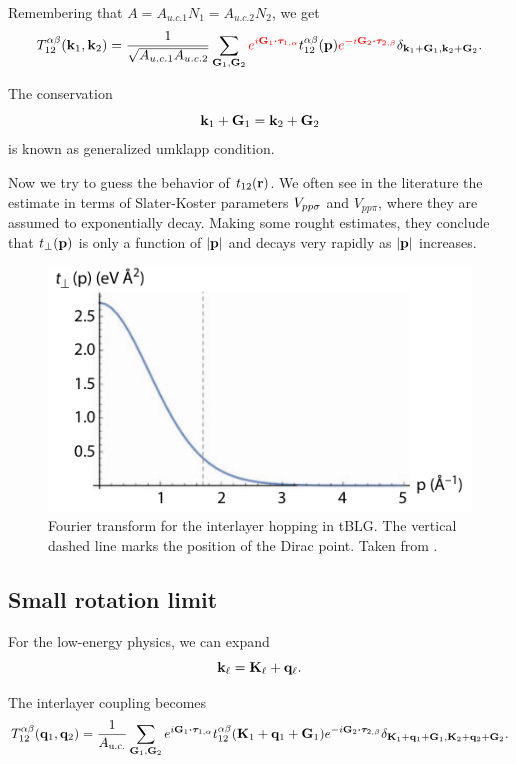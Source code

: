 \documentclass[a4paper,10pt]{article}
\begin{document}
Remembering that $A = A_{u.c.1} N_1 = A_{u.c.2} N_2$, we get
$$
T_{12}^{\alpha\beta}(\k_1,\k_2) = \frac{1}{\sqrt{A_{u.c.1} A_{u.c.2}}}
\sum_{\G_1, \G_2} \textcolor{red}{e^{i\G_1\vdot\vtau_{1,\alpha}}} t_{12}^{\alpha\beta}(\p)
\textcolor{red}{e^{-i\G_2\vdot\vtau_{2,\beta}}} \delta_{\k_1+\G_1, \k_2+\G_2}.
$$

The conservation
$$
{\vb{k}}_1 + {\vb{G}}_1 = {\vb{k}}_2 + {\vb{G}}_2
$$
is known as generalized umklapp condition.

\n

Now we try to guess the behavior of $t_{12}({\vb{r}})$. We often see in the literature the estimate in terms of Slater-Koster parameters $V_{pp\sigma}$ and $V_{pp\pi}$, where they are assumed to exponentially decay. Making some rought estimates, they conclude that $t_\perp({\vb{p}})$ is only a function of $\abs{{\vb{p}}}$ and decays very rapidly as $\abs{{\vb{p}}}$ increases.

\begin{figure}[H]
\centering
\includegraphics[width=0.6\linewidth]{fig/tperp.png}
\caption{Fourier transform for the interlayer hopping in tBLG. The vertical dashed line marks the position
of the Dirac point. Taken from \cite{handbook2019}.}
\label{fig:tperp}
\end{figure}

\subsection{Small rotation limit}

For the low-energy physics, we can expand
$$
{\vb{k}}_\ell = {\vb{K}}_\ell + {\vb{q}}_\ell.
$$

The interlayer coupling becomes
$$
T_{12}^{\alpha\beta}(\q_1,\q_2) = \frac{1}{A_{\text{u.c.}}} \sum_{\G_1,\G_2} e^{i\G_1\vdot\vtau_{1,\alpha}}
t_{12}^{\alpha\beta}(\K_1+\q_1+\G_1) e^{-i\G_2\vdot\vtau_{2,\beta}}
\delta_{\K_1+\q_1+\G_1,\K_2+\q_2+\G_2}.
$$
\end{document}
